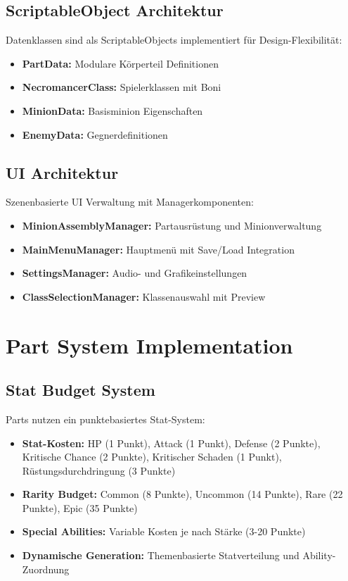 \subsection{ScriptableObject Architektur}
Datenklassen sind als ScriptableObjects implementiert für Design-Flexibilität:

\begin{itemize}
    \item \textbf{PartData:} Modulare Körperteil Definitionen
    \item \textbf{NecromancerClass:} Spielerklassen mit Boni
    \item \textbf{MinionData:} Basisminion Eigenschaften
    \item \textbf{EnemyData:} Gegnerdefinitionen
\end{itemize}

\subsection{UI Architektur}
Szenenbasierte UI Verwaltung mit Managerkomponenten:

\begin{itemize}
    \item \textbf{MinionAssemblyManager:} Partausrüstung und Minionverwaltung
    \item \textbf{MainMenuManager:} Hauptmenü mit Save/Load Integration
    \item \textbf{SettingsManager:} Audio- und Grafikeinstellungen
    \item \textbf{ClassSelectionManager:} Klassenauswahl mit Preview
\end{itemize}

\section{Part System Implementation}

\subsection{Stat Budget System}
Parts nutzen ein punktebasiertes Stat-System:

\begin{itemize}
    \item \textbf{Stat-Kosten:} HP (1 Punkt), Attack (1 Punkt), Defense (2 Punkte), Kritische Chance (2 Punkte), Kritischer Schaden (1 Punkt), Rüstungsdurchdringung (3 Punkte) 
    \item \textbf{Rarity Budget:} Common (8 Punkte), Uncommon (14 Punkte), Rare (22 Punkte), Epic (35 Punkte)
    \item \textbf{Special Abilities:} Variable Kosten je nach Stärke (3-20 Punkte)
    \item \textbf{Dynamische Generation:} Themenbasierte Statverteilung und Ability-Zuordnung
\end{itemize}

